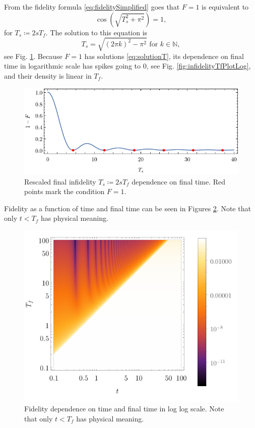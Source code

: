 From the fidelity formula \ref{eq:fidelitySimplified} goes that $F=1$ is equivalent to
\begin{equation}
    \cos \left(\sqrt{T_s^2+\pi ^2}\right)=1,
\end{equation}
for $T_s\coloneqq 2sT_f$. The solution to this equation is
\begin{equation}
    T_s=\sqrt{(2 \pi  k)^2-\pi ^2} \text{  for }k\in \mathbb{N},
    \label{eq:solutionT}
\end{equation}
see Fig. \ref{fig:fidelityZeros}. Because $F=1$ has solutions \ref{eq:solutionT}, its dependence on final time in logarithmic scale has spikes going to $0$, see Fig. \ref{fig:infidelityTfPlotLog}, and their density is linear in $T_f$.
\begin{figure}[H]
    \centering
    \includegraphics[scale=1.2]{../img/fidelityZeros.pdf}
    \caption{Rescaled final infidelity $T_s\coloneqq 2s T_f$ dependence on final time. Red points mark the condition $F=1$.}
    \label{fig:fidelityZeros}
\end{figure}


Fidelity as a function of time and final time can be seen in Figures \ref{fig:dens3}. Note that only $t<T_f$ has physical meaning.

\begin{figure}[H]
    \centering
    \includegraphics[scale=1.2]{../img/dens3.pdf}
    \caption{Fidelity dependence on time and final time in log log scale. Note that only $t<T_f$ has physical meaning.}
    \label{fig:dens3}
\end{figure}

